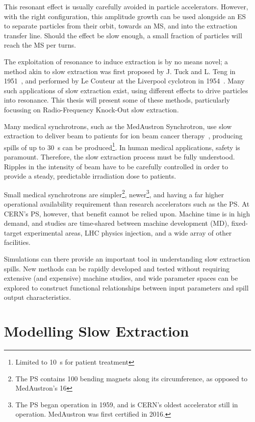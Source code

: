 \documentclass[11pt]{report}
\begin{document}
This resonant effect is usually carefully avoided in particle accelerators. However, with the right configuration, this amplitude growth can be used alongside an ES to separate particles from their orbit, towards an MS, and into the extraction transfer line. Should the effect be slow enough, a small fraction of particles will reach the MS per turns.

The exploitation of resonance to induce extraction is by no means novel; a method akin to slow extraction was first proposed by J. Tuck and L. Teng in 1951~\cite{Couteur_1951}, and performed by Le Couteur at the Liverpool cyclotron in 1954~\cite{Couteur_1955}. Many such applications of slow extraction exist, using different effects to drive particles into resonance. This thesis will present some of these methods, particularly focussing on Radio-Frequency Knock-Out slow extraction.

Many medical synchrotrons, such as the MedAustron Synchrotron, use slow extraction to deliver beam to patients for ion beam cancer therapy~\cite{ArrutiaSota:2845862}, producing spills of up to \qty{30}{\second} can be produced\footnote{Limited to \qty{10}{\second} for patient treatment}. In human medical applications, safety is paramount. Therefore, the slow extraction process must be fully understood. Ripples in the intensity of beam have to be carefully controlled in order to provide a steady, predictable irradiation dose to patients.

Small medical synchrotrons are simpler\footnote{The PS contains 100 bending magnets along its circumference, as opposed to MedAustron's 16}, newer\footnote{The PS began operation in 1959, and is CERN's oldest accelerator still in operation. MedAustron was first certified in 2016.}, and having a far higher operational availability requirement than research accelerators such as the PS. At CERN's PS, however, that benefit cannot be relied upon. Machine time is in high demand, and studies are time-shared between machine development (MD), fixed-target experimental areas, LHC physics injection, and a wide array of other facilities. 

Simulations can there provide an important tool in understanding slow extraction spills. New methods can be rapidly developed and tested without requiring extensive (and expensive) machine studies, and wide parameter spaces can be explored to construct functional relationships between input parameters and spill output characteristics. 

\section{Modelling Slow Extraction}
\end{document}
